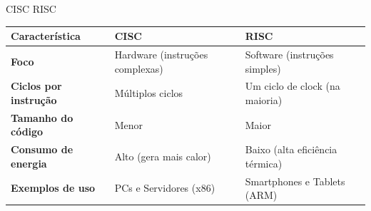 \documentclass[aspectratio=169]{beamer}
\begin{document}
\begin{frame}{CISC \texttimes{} RISC}
    \begin{center}
        \begin{tabular}{lll}
            \toprule
            \textbf{Característica} & \textbf{CISC} & \textbf{RISC} \\
            \midrule
            \textbf{Foco} & Hardware (instruções complexas) & Software (instruções simples) \\
            \textbf{Ciclos por instrução} & Múltiplos ciclos & Um ciclo de clock (na maioria) \\
            \textbf{Tamanho do código} & Menor & Maior \\
            \textbf{Consumo de energia} & Alto (gera mais calor) & Baixo (alta eficiência térmica) \\
            \textbf{Exemplos de uso} & PCs e Servidores (x86) & Smartphones e Tablets (ARM) \\
            \bottomrule
        \end{tabular}
    \end{center}
\end{frame}
\end{document}
